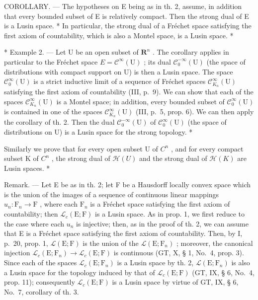 COROLLARY. --- The hypotheses on E being as in th. 2, assume, in addition that every bounded subset of E is relatively compact. Then the strong dual of E is a Lusin space. * In particular, the strong dual of a Fréchet space satisfying the first axiom of countability, which is also a Montel space, is a Lusin space. *

* Example 2. --- Let U be an open subset of \(\mathbf{R}^{n}\) . The corollary applies in particular to the Fréchet space \(E = \mathcal{C}^{\infty}(\mathrm{U})\) ; its dual \(\mathcal{C}_{0}^{-\infty}(\mathrm{U})\) (the space of distributions with compact support on U) is then a Lusin space. The space \(\mathcal{C}_{0}^{\infty}(\mathrm{U})\) is a strict inductive limit of a sequence of Fréchet spaces \(\mathcal{C}_{K_n}^{\infty}(\mathrm{U})\) satisfying the first axiom of countability (III, p.~9). We can show that each of the spaces \(\mathcal{C}_{K_n}^{\infty}(\mathrm{U})\) is a Montel space; in addition, every bounded subset of \(\mathcal{C}_{0}^{\infty}(\mathrm{U})\) is contained in one of the spaces \(\mathcal{C}_{K_n}^{\infty}(\mathrm{U})\) (III, p.~5, prop. 6). We can then apply the corollary of th. 2. Then the dual \(\mathcal{C}_{0}^{-\infty}(\mathrm{U})\) of \(\mathcal{C}_{0}^{\infty}(\mathrm{U})\) (the space of distributions on U) is a Lusin space for the strong topology. *

Similarly we prove that for every open subset U of \(C^{n}\) , and for every compact subset K of \(C^{n}\) , the strong dual of \(\mathcal{H}(U)\) and the strong dual of \(\mathcal{H}(K)\) are Lusin spaces. *

Remark. --- Let E be as in th. 2; let F be a Hausdorff locally convex space which is the union of the images of a sequence of continuous linear mappings \(u_n: \mathrm{F}_n \to \mathrm{F}\) , where each \(\mathrm{F}_n\) is a Fréchet space satisfying the first axiom of countability; then \(\mathcal{L}_c(\mathrm{E};\mathrm{F})\) is a Lusin space. As in prop. 1, we first reduce to the case where each \(u_n\) is injective; then, as in the proof of th. 2, we can assume that E is a Fréchet space satisfying the first axiom of countability. Then, by I, p.~20, prop. 1, \(\mathcal{L}(\mathrm{E};\mathrm{F})\) is the union of the \(\mathcal{L}(\mathrm{E};\mathrm{F}_n)\) ; moreover, the canonical injection \(\mathcal{L}_c(\mathrm{E};\mathrm{F}_n) \to \mathcal{L}_c(\mathrm{E};\mathrm{F})\) is continuous (GT, X, § 1, No.~4, prop. 3). Since each of the spaces \(\mathcal{L}_c(\mathrm{E};\mathrm{F}_n)\) is a Lusin space by th. 2, \(\mathcal{L}(\mathrm{E};\mathrm{F}_n)\) is also a Lusin space for the topology induced by that of \(\mathcal{L}_c(\mathrm{E};\mathrm{F})\) (GT, IX, § 6, No.~4, prop. 11); consequently \(\mathcal{L}_c(\mathrm{E};\mathrm{F})\) is a Lusin space by virtue of GT, IX, § 6, No.~7, corollary of th. 3.

